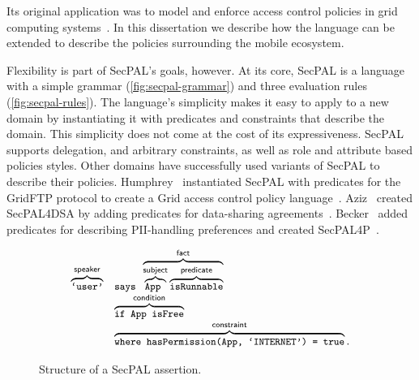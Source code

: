 \documentclass[thesis.tex]{subfiles}
\begin{document}
Its original application was to model and enforce access control
policies in grid computing systems~\cite{becker_secpal:_2010}.  In
this dissertation we describe how the language can be extended to
describe the policies surrounding the mobile ecosystem.

Flexibility is part of SecPAL's
goals, however. At its core, SecPAL is a language with a simple
grammar (\autoref{fig:secpal-grammar}) and three evaluation rules
(\autoref{fig:secpal-rules}). The language's simplicity makes it easy
to apply to a new domain by instantiating it with predicates and
constraints that describe the domain. This simplicity does not come at
the cost of its expressiveness. SecPAL supports delegation, and
arbitrary constraints, as well as role and attribute based policies
styles. Other domains have successfully used variants of SecPAL to
describe their policies. Humphrey~\etal{} instantiated SecPAL with
predicates for the GridFTP protocol to create a Grid access control
policy language~\cite{humphrey_fine-grained_2007}. Aziz~\etal{}
created SecPAL4DSA by adding predicates for data-sharing
agreements~\cite{aziz_secpal4dsa:_2011}.  Becker~\etal{} added
predicates for describing \ac{PII}-handling preferences and created
SecPAL4P~\cite{becker_framework_2009}.

\begin{figure}
  \newcommand{\bracetext}[1]{\text{\sffamily #1}}
  \newcommand{\smalltext}[1]{\text{\ttfamily\small #1}}
  \centering
  \begin{equation*}
    \begin{array}{r l}
      \overbrace{\smalltext{`user'}}^{\bracetext{speaker}} &
                                                             \smalltext{ says }\overbrace{\overbrace{\smalltext{ App }}^{\bracetext{subject}}\overbrace{\smalltext{ isRunnable}}^{\bracetext{predicate}}}^{\bracetext{fact}} \\
                                                           & \overbrace{\smalltext{ if App isFree}}^{\bracetext{condition}} \\
                                                           & \overbrace{\smalltext{ where hasPermission(App, `INTERNET') = true}}^{\bracetext{constraint}}.
    \end{array}
  \end{equation*}
  \caption{Structure of a SecPAL assertion.}
  \label{fig:assertion}
\end{figure}
\end{document}
